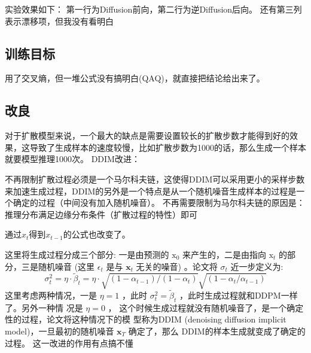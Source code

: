 \documentclass[]{ctexart}
\begin{document}
实验效果如下：
第一行为Diffusion前向，第二行为逆Diffusion后向。
还有第三列表示漂移项，但我没有看明白

\subsection{训练目标}

用了交叉熵，但一堆公式没有搞明白(QAQ)，就直接把结论给出来了。

\subsection{改良}
对于扩散模型来说，一个最大的缺点是需要设置较长的扩散步数才能得到好的效果，这导致了生成样本的速度较慢，比如扩散步数为1000的话，那么生成一个样本就要模型推理1000次。
DDIM改进：

不再限制扩散过程必须是一个马尔科夫链，这使得DDIM可以采用更小的采样步数来加速生成过程，DDIM的另外是一个特点是从一个随机噪音生成样本的过程是一个确定的过程（中间没有加入随机噪音）。
不再需要限制为马尔科夫链的原因是：
推理分布满足边缘分布条件（扩散过程的特性）即可

通过$x_t$得到$x_{t-1}$的公式也改变了。

这里将生成过程分成三个部分: 一是由预测的 $\mathrm{x}_0$ 来产生的，二是由指向 $\mathrm{x}_t$ 的部分，三是随机噪音 (这里 $\epsilon_t$ 是与 $\mathbf{x}_t$ 无关的噪音) 。论文将 $\sigma_t$ 近一步定义为:
$$
\sigma_t^2=\eta \cdot \tilde{\beta}_t=\eta \cdot \sqrt{\left(1-\alpha_{t-1}\right) /\left(1-\alpha_t\right)} \sqrt{\left(1-\alpha_t / \alpha_{t-1}\right)}
$$
这里考虑两种情况，一是 $\eta=1$ ，此时 $\sigma_t^2=\tilde{\beta}_t$ ，此时生成过程就和DDPM一样了。另外一种情 况是 $\eta=0$ ，
这个时候生成过程就没有随机噪音了，是一个确定性的过程，论文将这种情况下的模 型称为DDIM (denoising diffusion implicit model)，一旦最初的随机噪音 $\mathbf{x}_T$ 确定了，那么 DDIM的样本生成就变成了确定的过程。
这一改进的作用有点搞不懂
\end{document}
